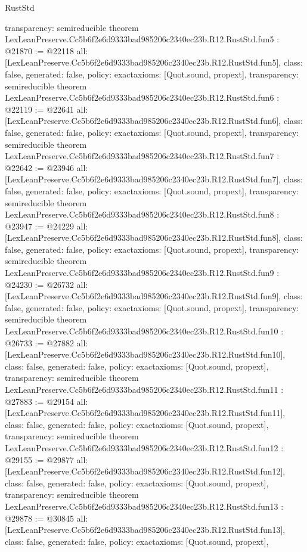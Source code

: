 \begin{lexlean}{RustStd}
\begin{coremodule}
{  transparency: semireducible
}
theorem LexLeanPreserve.Cc5b6f2e6d9333bad985206c2340ec23b.R12.RustStd.fun5 : @21870 := @22118 {
  all: [LexLeanPreserve.Cc5b6f2e6d9333bad985206c2340ec23b.R12.RustStd.fun5],
  class: false,
  generated: false,
  policy: exact{axioms: [Quot.sound, propext]},
  transparency: semireducible
}
theorem LexLeanPreserve.Cc5b6f2e6d9333bad985206c2340ec23b.R12.RustStd.fun6 : @22119 := @22641 {
  all: [LexLeanPreserve.Cc5b6f2e6d9333bad985206c2340ec23b.R12.RustStd.fun6],
  class: false,
  generated: false,
  policy: exact{axioms: [Quot.sound, propext]},
  transparency: semireducible
}
theorem LexLeanPreserve.Cc5b6f2e6d9333bad985206c2340ec23b.R12.RustStd.fun7 : @22642 := @23946 {
  all: [LexLeanPreserve.Cc5b6f2e6d9333bad985206c2340ec23b.R12.RustStd.fun7],
  class: false,
  generated: false,
  policy: exact{axioms: [Quot.sound, propext]},
  transparency: semireducible
}
theorem LexLeanPreserve.Cc5b6f2e6d9333bad985206c2340ec23b.R12.RustStd.fun8 : @23947 := @24229 {
  all: [LexLeanPreserve.Cc5b6f2e6d9333bad985206c2340ec23b.R12.RustStd.fun8],
  class: false,
  generated: false,
  policy: exact{axioms: [Quot.sound, propext]},
  transparency: semireducible
}
theorem LexLeanPreserve.Cc5b6f2e6d9333bad985206c2340ec23b.R12.RustStd.fun9 : @24230 := @26732 {
  all: [LexLeanPreserve.Cc5b6f2e6d9333bad985206c2340ec23b.R12.RustStd.fun9],
  class: false,
  generated: false,
  policy: exact{axioms: [Quot.sound, propext]},
  transparency: semireducible
}
theorem LexLeanPreserve.Cc5b6f2e6d9333bad985206c2340ec23b.R12.RustStd.fun10 : @26733 := @27882 {
  all: [LexLeanPreserve.Cc5b6f2e6d9333bad985206c2340ec23b.R12.RustStd.fun10],
  class: false,
  generated: false,
  policy: exact{axioms: [Quot.sound, propext]},
  transparency: semireducible
}
theorem LexLeanPreserve.Cc5b6f2e6d9333bad985206c2340ec23b.R12.RustStd.fun11 : @27883 := @29154 {
  all: [LexLeanPreserve.Cc5b6f2e6d9333bad985206c2340ec23b.R12.RustStd.fun11],
  class: false,
  generated: false,
  policy: exact{axioms: [Quot.sound, propext]},
  transparency: semireducible
}
theorem LexLeanPreserve.Cc5b6f2e6d9333bad985206c2340ec23b.R12.RustStd.fun12 : @29155 := @29877 {
  all: [LexLeanPreserve.Cc5b6f2e6d9333bad985206c2340ec23b.R12.RustStd.fun12],
  class: false,
  generated: false,
  policy: exact{axioms: [Quot.sound, propext]},
  transparency: semireducible
}
theorem LexLeanPreserve.Cc5b6f2e6d9333bad985206c2340ec23b.R12.RustStd.fun13 : @29878 := @30845 {
  all: [LexLeanPreserve.Cc5b6f2e6d9333bad985206c2340ec23b.R12.RustStd.fun13],
  class: false,
  generated: false,
  policy: exact{axioms: [Quot.sound, propext]},
}
\end{coremodule}
\end{lexlean}

